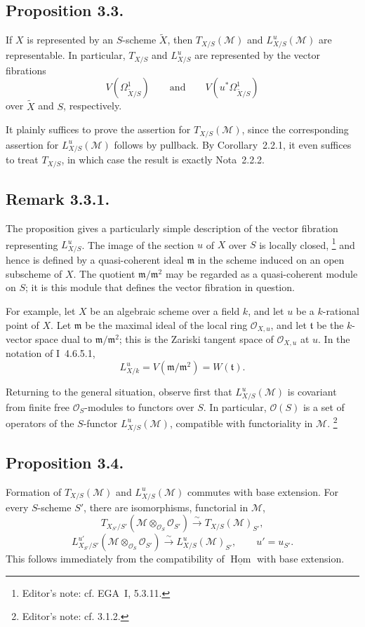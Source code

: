 \subsection*{Proposition 3.3.}
If \(X\) is represented by an \(S\)-scheme \(\widetilde X\), then
\(T_{X/S}(\mathcal M)\) and \(L^u_{X/S}(\mathcal M)\) are representable.
In particular, \(T_{X/S}\) and \(L^u_{X/S}\) are represented by the
vector fibrations
\[
  V(\Omega^1_{\widetilde X/S})
  \qquad\text{and}\qquad
  V(u^*\Omega^1_{\widetilde X/S})
\]
over \(\widetilde X\) and \(S\), respectively.

It plainly suffices to prove the assertion for \(T_{X/S}(\mathcal M)\),
since the corresponding assertion for \(L^u_{X/S}(\mathcal M)\) follows
by pullback. By Corollary~2.2.1, it even suffices to treat \(T_{X/S}\),
in which case the result is exactly Nota~2.2.2.

\subsection*{Remark 3.3.1.}
The proposition gives a particularly simple description of the vector
fibration representing \(L^u_{X/S}\). The image of the section \(u\) of
\(X\) over \(S\) is locally closed,
\footnote{Editor's note: cf. EGA~I, 5.3.11.}
and hence is defined by a quasi-coherent ideal \(\mathfrak m\) in the
scheme induced on an open subscheme of \(X\). The quotient
\(\mathfrak m/\mathfrak m^2\) may be regarded as a quasi-coherent module
on \(S\); it is this module that defines the vector fibration in question.

For example, let \(X\) be an algebraic scheme over a field \(k\), and let
\(u\) be a \(k\)-rational point of \(X\). Let \(\mathfrak m\) be the
maximal ideal of the local ring \(\mathcal O_{X,u}\), and let
\(\mathfrak t\) be the \(k\)-vector space dual to
\(\mathfrak m/\mathfrak m^2\); this is the Zariski tangent space of
\(\mathcal O_{X,u}\) at \(u\). In the notation of I~4.6.5.1,
\[
  L^u_{X/k}=V(\mathfrak m/\mathfrak m^2)=W(\mathfrak t).
\]

Returning to the general situation, observe first that
\(L^u_{X/S}(\mathcal M)\) is covariant from finite free
\(\mathcal O_S\)-modules to functors over \(S\). In particular,
\(\mathcal O(S)\) is a set of operators of the \(S\)-functor
\(L^u_{X/S}(\mathcal M)\), compatible with functoriality in
\(\mathcal M\).
\footnote{Editor's note: cf. 3.1.2.}

\subsection*{Proposition 3.4.}
Formation of \(T_{X/S}(\mathcal M)\) and \(L^u_{X/S}(\mathcal M)\)
commutes with base extension. For every \(S\)-scheme \(S'\), there are
isomorphisms, functorial in \(\mathcal M\),
\[
  T_{X_{S'}/S'}(\mathcal M\otimes_{\mathcal O_S}\mathcal O_{S'})
    \xrightarrow{\sim} T_{X/S}(\mathcal M)_{S'},
\]
\[
  L^{u'}_{X_{S'}/S'}(\mathcal M\otimes_{\mathcal O_S}\mathcal O_{S'})
    \xrightarrow{\sim} L^u_{X/S}(\mathcal M)_{S'},
  \qquad u'=u_{S'}.
\]
This follows immediately from the compatibility of
\(\underline{\operatorname{Hom}}\) with base extension.

